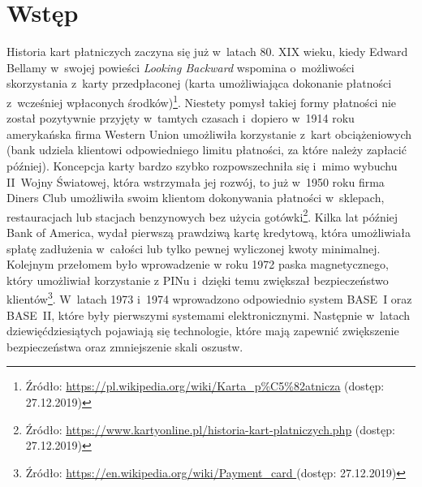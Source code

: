 \documentclass[inzynierska]{pwr_wmat_praca_dyplomowa}
\theoremstyle{plain}
\numberwithin{theorem}{chapter}
\theoremstyle{definition}
\numberwithin{theorem}{chapter}
\begin{document}
	
\newcommand{\htx}{h_{\theta}(\boldsymbol{x_i})}
\newcommand{\es}{\mathcal{S}}
\newcommand{\ef}{\mathcal{F}}
\newcommand{\ku}{\mathcal{Q}}
\newcommand{\iks}{\boldsymbol{x}}
\newcommand{\yht}[1]{\hat{y_i}^{(#1)}}
\newcommand{\ytrue}{\boldsymbol{y}}


\frontmatter
\maketitle
\tableofcontents
\mainmatter



\chapter*{Wstęp}
 

Historia kart płatniczych zaczyna się już w~latach 80. XIX wieku, kiedy Edward Bellamy w~swojej powieści \textit{Looking Backward} wspomina o~możliwości skorzystania z~karty przedpłaconej (karta umożliwiająca dokonanie płatności z~wcześniej wpłaconych środków)\footnote{Źródło: \url{https://pl.wikipedia.org/wiki/Karta_p\%C5\%82atnicza} (dostęp: 27.12.2019)}. Niestety pomysł takiej formy płatności nie został pozytywnie przyjęty w~tamtych czasach i~dopiero w~1914 roku amerykańska firma Western Union umożliwiła korzystanie z~kart obciążeniowych (bank udziela klientowi odpowiedniego limitu płatności, za które należy zapłacić później). Koncepcja karty bardzo szybko rozpowszechniła się i~mimo wybuchu II~Wojny Światowej, która wstrzymała jej rozwój, to już w~1950 roku firma Diners Club umożliwiła swoim klientom dokonywania płatności w~sklepach, restauracjach lub stacjach benzynowych bez użycia gotówki\footnote{Źródło: \url{https://www.kartyonline.pl/historia-kart-platniczych.php} (dostęp: 27.12.2019)}. Kilka lat później Bank of America, wydał pierwszą prawdziwą kartę kredytową, która umożliwiała spłatę zadłużenia w~całości lub tylko pewnej wyliczonej kwoty minimalnej. Kolejnym przełomem było wprowadzenie w roku 1972 paska magnetycznego, który umożliwiał korzystanie z PINu i~dzięki temu zwiększał bezpieczeństwo klientów\footnote{Źródło: \url{https://en.wikipedia.org/wiki/Payment_card } (dostęp: 27.12.2019)}. W~latach 1973 i~1974 wprowadzono odpowiednio system BASE~I oraz BASE~II, które były pierwszymi systemami elektronicznymi. Następnie w~latach dziewięćdziesiątych pojawiają się technologie, które mają zapewnić zwiększenie bezpieczeństwa oraz zmniejszenie skali oszustw.
\end{document}
